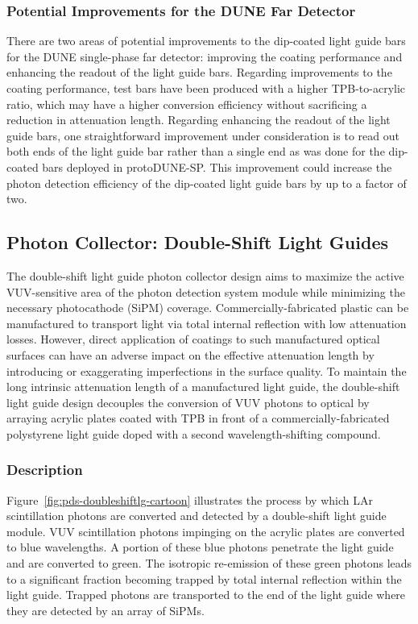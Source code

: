 \subsubsection{Potential Improvements for the DUNE Far Detector}

There are two areas of potential improvements to the dip-coated light guide bars for the DUNE single-phase far detector: improving the coating performance and enhancing the readout of the light guide bars.  Regarding improvements to the coating performance, test bars have been produced with a higher TPB-to-acrylic ratio, which may have a higher conversion efficiency without sacrificing a reduction in attenuation length.  Regarding enhancing the readout of the light guide bars, one straightforward improvement under consideration is to read out both ends of the light guide bar rather than a single end as was done for the dip-coated bars deployed in protoDUNE-SP.  This improvement could increase the photon detection efficiency of the dip-coated light guide bars by up to a factor of two.


\subsection{Photon Collector: Double-Shift Light Guides}
\label{ssec:fdsp-pd-pc-bar2}

The double-shift light guide photon collector design aims to maximize the active VUV-sensitive area of the photon detection system module while minimizing the necessary photocathode (SiPM) coverage. Commercially-fabricated plastic can be manufactured to transport light via total internal reflection with low attenuation losses. However, direct application of coatings to such manufactured optical surfaces can have an adverse impact on the effective attenuation length by introducing or exaggerating imperfections in the surface quality. To maintain the long intrinsic attenuation length of a manufactured light guide, the double-shift light guide design decouples the conversion of VUV photons to optical by arraying acrylic plates coated with TPB in front of a commercially-fabricated polystyrene light guide doped with a second wavelength-shifting compound.

\subsubsection{Description}

Figure~\ref{fig:pds-doubleshiftlg-cartoon} illustrates the process by which LAr scintillation photons are converted and detected by a double-shift light guide module. VUV scintillation photons impinging on the acrylic plates are converted to blue wavelengths. A portion of these blue photons penetrate the light guide and are converted to green. The isotropic re-emission of these green photons leads to a significant fraction becoming trapped by total internal reflection within the light guide. Trapped photons are transported to the end of the light guide where they are detected by an array of SiPMs.

